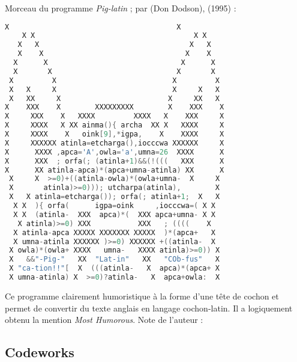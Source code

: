 \documentclass[12pt]{article} %
\begin{document}
\newpage
Morceau du programme \textit{Pig-latin} ; par  (Don Dodson), (1995) :
\begin{lstlisting}[language=C, caption={Piglatin}, label={code:piglatin}]
    X                                       X
    X X                                     X X
   X   X                                   X   X
   X    X                                 X    X
  X      X                               X      X
  X       X                             X       X
 X         X                           X         X
 X   X     X                           X     X   X
 X   XX     X                         X     XX   X
X    XXX    X        XXXXXXXXX        X    XXX    X
X     XXX    X   XXXX         XXXX   X    XXX     X
X     XXXX   X XX ainma(){ archa  XX X   XXXX     X
X     XXXX    X   oink[9],*igpa,    X    XXXX     X
X     XXXXXX atinla=etcharga(),iocccwa XXXXXX     X
X      XXXX ,apca='A',owla='a',umna=26  XXXX      X
X      XXX  ; orfa(; (atinla+1)&&(!(((   XXX      X
X      XX atinla-apca)*(apca+umna-atinla) XX      X
 X     X  >=0)+((atinla-owla)*(owla+umna-  X     X
 X       atinla)>=0))); utcharpa(atinla),        X
 X   X atinla=etcharga()); orfa(; atinla+1;  X   X
  X X  ){ orfa(      igpa=oink     ,iocccwa=( X X
  X X  (atinla-  XXX  apca)*(  XXX apca+umna- X X
   X atinla)>=0) XXX           XXX   ; ((((    X
  X atinla-apca XXXXX XXXXXXX XXXXX  )*(apca+   X
  X umna-atinla XXXXXX )>=0) XXXXXX +((atinla-  X
 X owla)*(owla+ XXXX   umna-   XXXX atinla)>=0)) X
 X   &&"-Pig-"   XX  "Lat-in"   XX   "COb-fus"   X
 X "ca-tion!!"[  X  (((atinla-   X  apca)*(apca+ X
 X umna-atinla) X  >=0)?atinla-   X  apca+owla:  X
\end{lstlisting}
Ce programme clairement humoristique à la forme d'une tête de cochon et permet de convertir du texte anglais en langage cochon-latin. Il a logiquement obtenu la mention \textit{Most Humorous}. Note de l'auteur : 

\newpage
\subsection{Codeworks} \label{codework-exemples}
\end{document}
